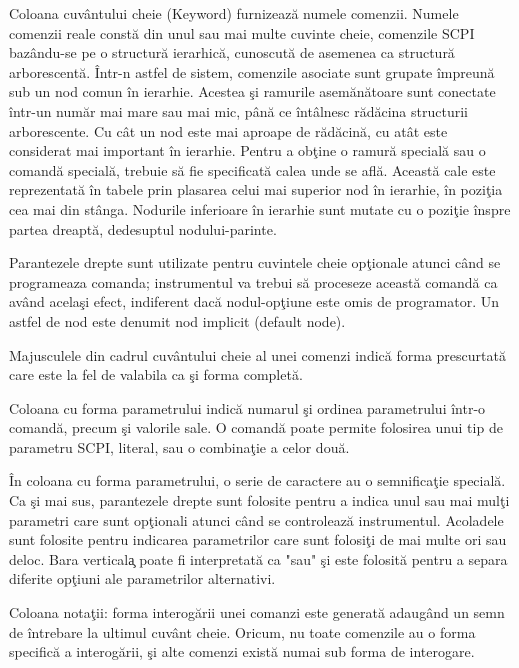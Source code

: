 Coloana cuv\^{a}ntului cheie (Keyword) furnizeaz\u{a} numele comenzii. Numele comenzii reale const\u{a} din unul sau mai multe cuvinte cheie, comenzile SCPI baz\^{a}ndu-se pe o structur\u{a} ierarhic\u{a}, cunoscut\u{a} de asemenea ca structur\u{a} arborescent\u{a}. \^{I}ntr-n astfel de sistem, comenzile asociate sunt grupate \^{i}mpreun\u{a} sub un nod comun \^{i}n ierarhie. Acestea \c{s}i ramurile asem\u{a}n\u{a}toare sunt conectate \^{i}ntr-un num\u{a}r mai mare sau mai mic, p\^{a}n\u{a} ce \^{i}nt\^{a}lnesc r\u{a}d\u{a}cina structurii arborescente. Cu c\^{a}t un nod este mai aproape de r\u{a}d\u{a}cin\u{a}, cu at\^{a}t este considerat mai important \^{i}n ierarhie. Pentru a ob\c{t}ine o ramur\u{a} special\u{a} sau o comand\u{a} special\u{a}, trebuie s\u{a} fie specificat\u{a} calea unde se afl\u{a}. Aceast\u{a} cale este reprezentat\u{a} \^{i}n tabele prin plasarea celui mai superior nod \^{i}n ierarhie, \^{i}n pozi\c{t}ia cea mai din st\^{a}nga. Nodurile inferioare \^{i}n ierarhie sunt mutate cu o pozi\c{t}ie \^{i}nspre partea dreapt\u{a}, dedesuptul nodului-parinte.

Parantezele drepte sunt utilizate pentru cuvintele cheie op\c{t}ionale atunci c\^{a}nd se programeaza comanda; instrumentul va trebui s\u{a} proceseze aceast\u{a} comand\u{a} ca av\^{a}nd acela\c{s}i efect, indiferent dac\u{a} nodul-op\c{t}iune este omis de programator. Un astfel de nod este denumit nod implicit (default node).

Majusculele din cadrul cuv\^{a}ntului cheie al unei comenzi indic\u{a} forma prescurtat\u{a} care este la fel de valabila ca \c{s}i forma complet\u{a}.

Coloana cu forma parametrului indic\u{a} numarul \c{s}i ordinea parametrului \^{i}ntr-o comand\u{a}, precum \c{s}i valorile sale. O comand\u{a} poate permite folosirea unui tip de parametru SCPI, literal, sau o combina\c{t}ie a celor dou\u{a}.
 
\^{I}n coloana cu forma parametrului, o serie de caractere au o semnifica\c{t}ie special\u{a}. Ca \c{s}i mai sus, parantezele drepte sunt folosite pentru a indica unul sau mai mul\c{t}i parametri care sunt op\c{t}ionali atunci c\^{a}nd se controleaz\u{a} instrumentul. Acoladele sunt folosite pentru indicarea parametrilor care sunt folosi\c{t}i de mai multe ori sau deloc. Bara vertical\c{a} poate fi interpretat\u{a} ca "sau" \c{s}i este folosit\u{a} pentru a separa diferite op\c{t}iuni ale parametrilor alternativi. 

Coloana nota\c{t}ii: forma interog\u{a}rii unei comanzi este generat\u{a} adaug\^{a}nd un semn de \^{i}ntrebare la ultimul cuv\^{a}nt cheie. Oricum, nu toate comenzile au o forma specific\u{a} a interog\u{a}rii, \c{s}i alte comenzi exist\u{a} numai sub forma de interogare.

